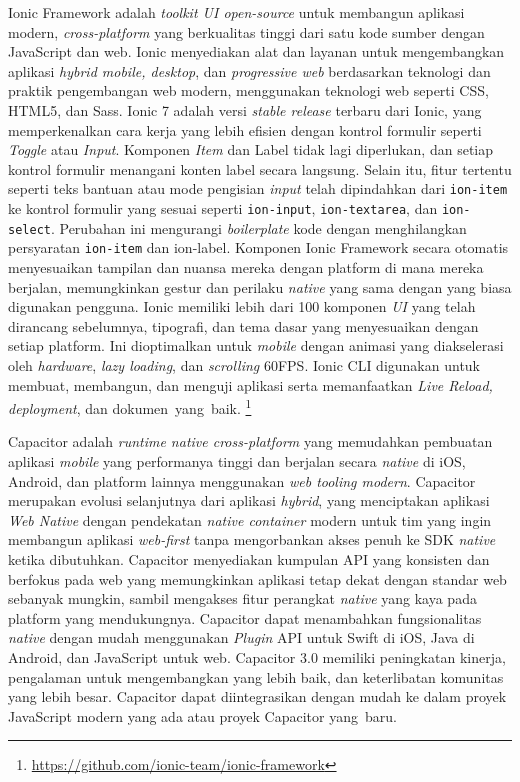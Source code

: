 Ionic Framework adalah \textit{toolkit UI open-source} untuk membangun aplikasi modern, \textit{cross-platform} yang berkualitas tinggi dari satu kode sumber dengan JavaScript dan web. Ionic menyediakan alat dan layanan untuk mengembangkan aplikasi \textit{hybrid mobile, desktop}, dan \textit{progressive web} berdasarkan teknologi dan praktik pengembangan web modern, menggunakan teknologi web seperti CSS, HTML5, dan Sass. Ionic 7 adalah versi \textit{stable release} terbaru dari Ionic, yang memperkenalkan cara kerja yang lebih efisien dengan kontrol formulir seperti \textit{Toggle} atau \textit{Input}. Komponen \textit{Item} dan Label tidak lagi diperlukan, dan setiap kontrol formulir menangani konten label secara langsung. Selain itu, fitur tertentu seperti teks bantuan atau mode pengisian \textit{input} telah dipindahkan dari \texttt{ion-item} ke kontrol formulir yang sesuai seperti \texttt{ion-input}, \texttt{ion-textarea}, dan \texttt{ion-select}. Perubahan ini mengurangi \textit{boilerplate} kode dengan menghilangkan persyaratan \texttt{ion-item} dan ion-label. Komponen Ionic Framework secara otomatis menyesuaikan tampilan dan nuansa mereka dengan platform di mana mereka berjalan, memungkinkan gestur dan perilaku \textit{native} yang sama dengan yang biasa digunakan pengguna. Ionic memiliki lebih dari 100 komponen \textit{UI} yang telah dirancang sebelumnya, tipografi, dan tema dasar yang menyesuaikan dengan setiap platform. Ini dioptimalkan untuk \textit{mobile} dengan animasi yang diakselerasi oleh \textit{hardware}, \textit{lazy loading}, dan \textit{scrolling} 60FPS. Ionic CLI digunakan untuk membuat, membangun, dan menguji aplikasi serta memanfaatkan \textit{Live Reload, deployment}, dan dokumen~yang~baik. \footnote{\url{https://github.com/ionic-team/ionic-framework}}

Capacitor adalah \textit{runtime native cross-platform} yang memudahkan pembuatan aplikasi \textit{mobile} yang performanya tinggi dan berjalan secara \textit{native} di iOS, Android, dan platform lainnya menggunakan \textit{web tooling modern}. Capacitor merupakan evolusi selanjutnya dari aplikasi \textit{hybrid}, yang menciptakan aplikasi \textit{Web Native} dengan pendekatan \textit{native container} modern untuk tim yang ingin membangun aplikasi \textit{web-first} tanpa mengorbankan akses penuh ke SDK \textit{native} ketika dibutuhkan. Capacitor menyediakan kumpulan API yang konsisten dan berfokus pada web yang memungkinkan aplikasi tetap dekat dengan standar web sebanyak mungkin, sambil mengakses fitur perangkat \textit{native} yang kaya pada platform yang mendukungnya. Capacitor dapat menambahkan fungsionalitas \textit{native} dengan mudah menggunakan \textit{Plugin} API untuk Swift di iOS, Java di Android, dan JavaScript untuk web. Capacitor 3.0 memiliki peningkatan kinerja, pengalaman untuk mengembangkan yang lebih baik, dan keterlibatan komunitas yang lebih besar. Capacitor dapat diintegrasikan dengan mudah ke dalam proyek JavaScript modern yang ada atau proyek Capacitor yang~baru.

